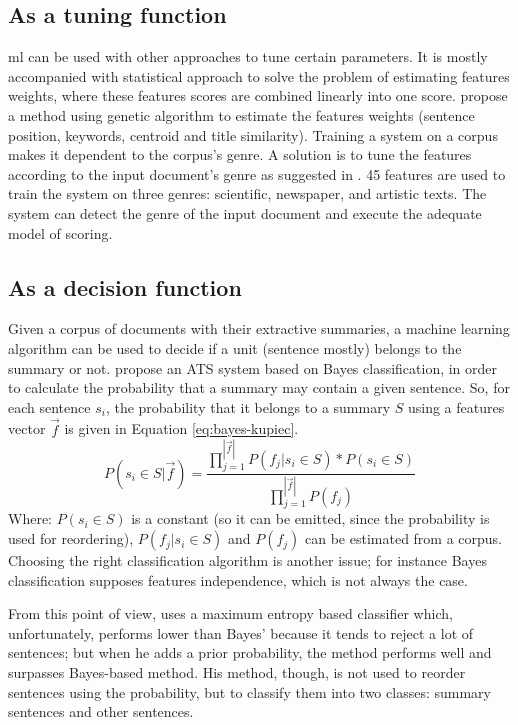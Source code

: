\subsection{As a tuning function}

\ac{ml} can be used with other approaches to tune certain parameters. 
It is mostly accompanied with statistical approach to solve the problem of estimating features weights, where these features scores are combined linearly into one score.
\citet{05-yeh-al} propose a method using genetic algorithm to estimate the features weights (sentence position, keywords, centroid and title similarity). 
Training a system on a corpus makes it dependent to the corpus's genre. 
A solution is to tune the features according to the input document's genre as suggested in \citep{10-yatsko-al}. 
45 features are used to train the system on three genres: scientific, newspaper, and artistic texts. 
The system can detect the genre of the input document and execute the adequate model of scoring. 

\subsection{As a decision function}

Given a corpus of documents with their extractive summaries, a machine learning algorithm can be used to decide if a unit (sentence mostly) belongs to the summary or not.
\citet{95-kupiec-al} propose an ATS system based on Bayes classification, in order to calculate the probability that a summary may contain a given sentence.
So, for each sentence $ s_i $, the probability that it belongs to a summary $ S $ using a features vector $ \overrightarrow{f} $ is given in Equation \ref{eq:bayes-kupiec}.
\begin{equation}
	\label{eq:bayes-kupiec}
	P(s_i \in S | \overrightarrow{f}) = %
	\frac{\prod\limits_{j = 1}^{|\overrightarrow{f}|} P(f_j | s_i \in S) * P(s_i \in S)}
	{\prod\limits_{j = 1}^{|\overrightarrow{f}|} P(f_j)}
\end{equation}
Where: 
$ P(s_i \in S) $ is a constant (so it can be emitted, since the probability is used for reordering), $ P(f_j | s_i \in S) $ and $ P(f_j) $ can be estimated from a corpus.
%
Choosing the right classification algorithm is another issue; for instance Bayes classification supposes features independence, which is not always the case.

From this point of view, \citet{02-osborne} uses a maximum entropy based classifier which, unfortunately, performs lower than Bayes' because it tends to reject a lot of sentences; but when he adds a prior probability, the method performs well and surpasses Bayes-based method.
His method, though, is not used to reorder sentences using the probability, but to classify them into two classes: summary sentences and other sentences.

